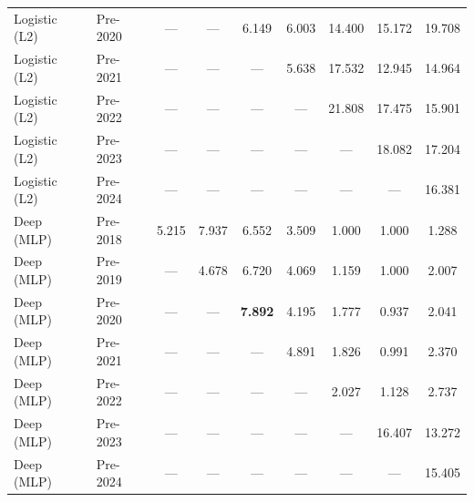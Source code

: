 \begin{table}[htbp]
{\begin{tabular}{l lccccccc}
Logistic (L2) & Pre-2020 & --- & --- & 6.149 & 6.003 & 14.400 & 15.172 & 19.708 \\
Logistic (L2) & Pre-2021 & --- & --- & --- & 5.638 & 17.532 & 12.945 & 14.964 \\
Logistic (L2) & Pre-2022 & --- & --- & --- & --- & 21.808 & 17.475 & 15.901 \\
Logistic (L2) & Pre-2023 & --- & --- & --- & --- & --- & 18.082 & 17.204 \\
Logistic (L2) & Pre-2024 & --- & --- & --- & --- & --- & --- & 16.381 \\
Deep (MLP) & Pre-2018 & 5.215 & 7.937 & 6.552 & 3.509 & 1.000 & 1.000 & 1.288 \\
Deep (MLP) & Pre-2019 & --- & 4.678 & 6.720 & 4.069 & 1.159 & 1.000 & 2.007 \\
Deep (MLP) & Pre-2020 & --- & --- & \textbf{7.892} & 4.195 & 1.777 & 0.937 & 2.041 \\
Deep (MLP) & Pre-2021 & --- & --- & --- & 4.891 & 1.826 & 0.991 & 2.370 \\
Deep (MLP) & Pre-2022 & --- & --- & --- & --- & 2.027 & 1.128 & 2.737 \\
Deep (MLP) & Pre-2023 & --- & --- & --- & --- & --- & 16.407 & 13.272 \\
Deep (MLP) & Pre-2024 & --- & --- & --- & --- & --- & --- & 15.405 \\
\bottomrule
\end{tabular}%
}
\end{table}